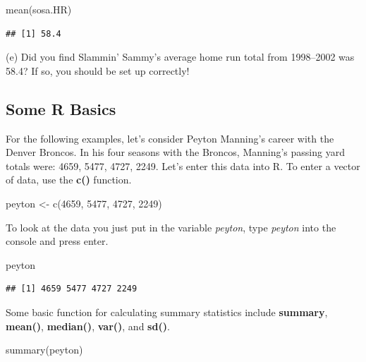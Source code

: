 \documentclass[
  11pt,
]{book}
\newenvironment{Shaded}{\begin{snugshade}}{\end{snugshade}}
\newcommand{\DecValTok}[1]{\textcolor[rgb]{0.00,0.00,0.81}{#1}}
\newcommand{\FunctionTok}[1]{\textcolor[rgb]{0.00,0.00,0.00}{#1}}
\newcommand{\NormalTok}[1]{#1}
\newcommand{\OtherTok}[1]{\textcolor[rgb]{0.56,0.35,0.01}{#1}}
\theoremstyle{definition}
\theoremstyle{definition}
\theoremstyle{definition}
\theoremstyle{definition}
\theoremstyle{remark}
\begin{document}
\begin{Shaded}
\begin{Highlighting}[]
\FunctionTok{mean}\NormalTok{(sosa.HR)}
\end{Highlighting}
\end{Shaded}

\begin{verbatim}
## [1] 58.4
\end{verbatim}

\noindent (e) Did you find Slammin' Sammy's average home run total from 1998--2002 was 58.4? If so, you should be set up correctly!

\newpage

\hypertarget{some-r-basics}{%
\subsection{Some R Basics}\label{some-r-basics}}

For the following examples, let's consider Peyton Manning's career with the Denver Broncos. In his four seasons with the Broncos, Manning's passing yard totals were: 4659, 5477, 4727, 2249. Let's enter this data into R. To enter a vector of data, use the \textbf{c()} function.

\begin{Shaded}
\begin{Highlighting}[]
\NormalTok{peyton }\OtherTok{\textless{}{-}} \FunctionTok{c}\NormalTok{(}\DecValTok{4659}\NormalTok{, }\DecValTok{5477}\NormalTok{, }\DecValTok{4727}\NormalTok{, }\DecValTok{2249}\NormalTok{)}
\end{Highlighting}
\end{Shaded}

To look at the data you just put in the variable \emph{peyton}, type \emph{peyton} into the console and press enter.

\begin{Shaded}
\begin{Highlighting}[]
\NormalTok{peyton}
\end{Highlighting}
\end{Shaded}

\begin{verbatim}
## [1] 4659 5477 4727 2249
\end{verbatim}

Some basic function for calculating summary statistics include \textbf{summary}, \textbf{mean()}, \textbf{median()}, \textbf{var()}, and \textbf{sd()}.

\begin{Shaded}
\begin{Highlighting}[]
\FunctionTok{summary}\NormalTok{(peyton)}
\end{Highlighting}
\end{Shaded}
\end{document}

